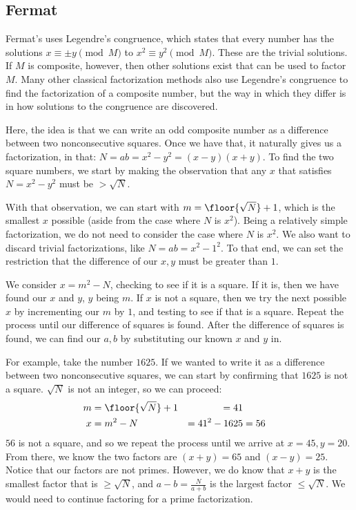 \documentclass{article}
\begin{document}
\subsection{ Fermat }
\par Fermat's uses Legendre's congruence, which states that every number has the solutions
$x \equiv \pm y \pmod{M}$ to $x^2 \equiv y^2 \pmod{M}$.  These are the trivial solutions. If $M$ is composite,
however, then other solutions exist that can be used to factor $M$. Many other classical factorization methods
also use Legendre's congruence to find the factorization of a composite number, but the way in which they differ
is in how solutions to the congruence are discovered.

\par Here, the idea is that we can write an odd composite number as a difference between two nonconsecutive
squares. Once we have that, it naturally gives us a factorization, in that: $N = ab = x^2 - y^2 = (x-y)(x+y)$.
To find the two square numbers, we start by making the observation that any $x$ that satisfies $N=x^2-y^2$
must be $> \sqrt{N}$.

\par With that observation, we can start with $m=\floor{\sqrt{N}}+1$, which is the smallest $x$ possible (aside
from the case where $N$ is $x^2$). Being a relatively simple factorization, we do not need to consider the case
where $N$ is $x^2$. We also want to discard trivial factorizations, like $N = ab = x^2 - 1^2$. To that end, we
can set the restriction that the difference of our $x,y$ must be greater than $1$.

\par We consider $x=m^2-N$, checking to see if it is a square. If it is, then we have found our $x$ and $y$, $y$
being $m$. If $x$ is not a square, then we try the next possible $x$ by incrementing our $m$ by $1$, and testing to see
if that is a square. Repeat the process until our difference of squares is found. After the difference of squares
is found, we can find our $a,b$ by substituting our known $x$ and $y$ in.

\par For example, take the number $1625$. If we wanted to write it as a difference between two nonconsecutive squares,
we can start by confirming that $1625$ is not a square. $\sqrt{N}$ is not an integer, so we can proceed:
\begin{align*}
    m &= \floor{\sqrt{N}}+1 &= 41 \\
    x &= m^2-N &= 41^2 - 1625 &= 56
\end{align*}
$56$ is not a square, and so we repeat the process until we arrive at $x = 45, y = 20$. From there, we know the two
factors are $(x+y)=65$ and $(x-y)=25$. Notice that our factors are not primes. However, we do know that $x+y$ is
the smallest factor that is $\geq \sqrt{N}$, and $a-b = \frac{N}{a+b}$ is the largest factor $\leq \sqrt{N}$. We
would need to continue factoring for a prime factorization.
\end{document}
